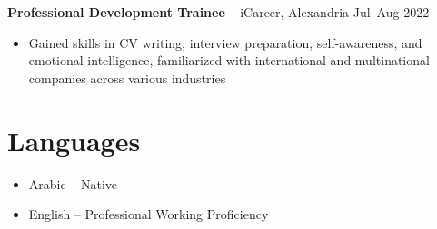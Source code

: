 \documentclass[11pt,a4paper]{article}
\begin{document}
\vspace{4pt}

\textbf{Professional Development Trainee} -- iCareer, Alexandria \hfill Jul--Aug 2022
\begin{itemize}[leftmargin=0.5cm, itemsep=1pt, topsep=2pt, label={-}]
    \item Gained skills in CV writing, interview preparation, self-awareness, and emotional intelligence, familiarized with international and multinational companies across various industries
\end{itemize}

\vspace{4pt}

\section*{Languages}

\begin{itemize}[leftmargin=0.5cm, itemsep=3pt, topsep=2pt, label={-}]
    \item Arabic -- Native
    \item English -- Professional Working Proficiency
\end{itemize}
\end{document}
